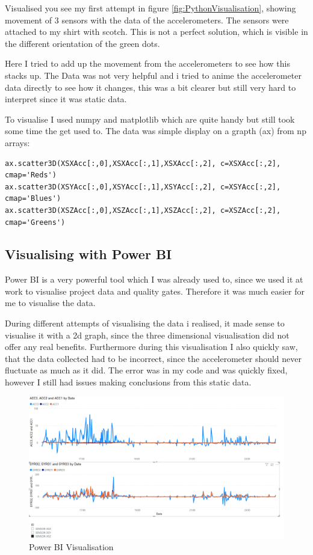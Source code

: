Visualised you see my first attempt in figure \ref{fig:PythonVisualisation}, showing movement of 3 sensors with the data of the accelerometers. The sensors were attached to my shirt with scotch. This is not a perfect solution, which is visible in the different orientation of the green dots. 

Here I tried to add up the movement from the accelerometers to see how this stacks up. The Data was not very helpful and i tried to anime the accelerometer data directly to see how it changes, this was a bit clearer but still very hard to interpret since it was static data. 

To visualise I used numpy and matplotlib which are quite handy but still took some time the get used to.
The data was simple display on a grapth (ax) from np arrays:

\begin{lstlisting}
ax.scatter3D(XSXAcc[:,0],XSXAcc[:,1],XSXAcc[:,2], c=XSXAcc[:,2], cmap='Reds')
ax.scatter3D(XSYAcc[:,0],XSYAcc[:,1],XSYAcc[:,2], c=XSYAcc[:,2], cmap='Blues')
ax.scatter3D(XSZAcc[:,0],XSZAcc[:,1],XSZAcc[:,2], c=XSZAcc[:,2], cmap='Greens')
\end{lstlisting}

\subsection{Visualising with Power BI}

\gls{Power BI} is a very powerful tool which I was already used to, since we used it at work to visualise project data and quality gates. Therefore it was much easier for me to visualise the data.

During different attempts of visualising the data i realised, it made sense to visualise it with a 2d graph, since the three dimensional visualisation did not offer any real benefits. Furthermore during this visualisation I also quickly saw, that the data collected had to be incorrect, since the accelerometer should never fluctuate as much as it did. The error was in my code and was quickly fixed, however I still had issues making conclusions from this static data.

\begin{figure}[h]
\begin{center}
\includegraphics[width=0.7\linewidth]{images/PowerBIVisualisiation.png}
  \end{center}
  \caption{Power BI Visualisation}
  \label{fig:PowerBIVisualisation}
\end{figure}

\newpage